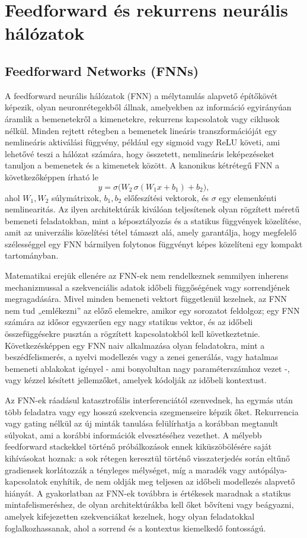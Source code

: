 \chapter{Feedforward és rekurrens neurális hálózatok}
\section{Feedforward Networks (FNNs)}
A feedforward neurális hálózatok (FNN) a mélytanulás alapvető építőkövét képezik, olyan neuronrétegekből állnak, amelyekben az információ egyirányúan áramlik a bemenetekről a kimenetekre, rekurrens kapcsolatok vagy ciklusok nélkül.  Minden rejtett rétegben a bemenetek lineáris transzformációját egy nemlineáris aktiválási függvény, például egy sigmoid vagy ReLU követi, ami lehetővé teszi a hálózat számára, hogy összetett, nemlineáris leképezéseket tanuljon a bemenetek és a kimenetek között. A kanonikus kétrétegű FNN a következőképpen írható le 
\[
y = \sigma\bigl(W_2\,\sigma(W_1 x + b_1) + b_2\bigr),
\]
ahol \(W_1, W_2\) súlymátrixok, \(b_1,b_2\) előfeszítési vektorok, és \(\sigma\) egy elemenkénti nemlinearitás. Az ilyen architektúrák kiválóan teljesítenek olyan rögzített méretű bemeneti feladatokban, mint a képosztályozás és a statikus függvények közelítése, amit az univerzális közelítési tétel támaszt alá, amely garantálja, hogy megfelelő szélességgel egy FNN bármilyen folytonos függvényt képes közelíteni egy kompakt tartományban.

Matematikai erejük ellenére az FNN-ek nem rendelkeznek semmilyen inherens mechanizmussal a szekvenciális adatok időbeli függőségének vagy sorrendjének megragadására. Mivel minden bemeneti vektort függetlenül kezelnek, az FNN nem tud „emlékezni” az előző elemekre, amikor egy sorozatot feldolgoz; egy FNN számára az idősor egyszerűen egy nagy statikus vektor, és az időbeli összefüggésekre pusztán a rögzített kapcsolatokból kell következtetnie. Következésképpen egy FNN naiv alkalmazása olyan feladatokra, mint a beszédfelismerés, a nyelvi modellezés vagy a zenei generálás, vagy hatalmas bemeneti ablakokat igényel - ami bonyolultan nagy paraméterszámhoz vezet -, vagy kézzel késített jellemzőket, amelyek kódolják az időbeli kontextust. 

Az FNN-ek ráadásul katasztrofális interferenciától szenvednek, ha egymás után több feladatra vagy egy hosszú szekvencia szegmenseire képzik őket.  Rekurrencia vagy gating nélkül az új minták tanulása felülírhatja a korábban megtanult súlyokat, ami a korábbi információk elvesztéséhez vezethet. A mélyebb feedforward stackekkel történő próbálkozások ennek kiküszöbölésére saját kihívásokat hoznak: a sok rétegen keresztül történő visszaterjedés során eltűnő gradiensek korlátozzák a tényleges mélységet, míg a maradék vagy autópálya-kapcsolatok enyhítik, de nem oldják meg teljesen az időbeli modellezés alapvető hiányát. A gyakorlatban az FNN-ek továbbra is értékesek maradnak a statikus mintafelismeréshez, de olyan architektúrákba kell őket bővíteni vagy beágyazni, amelyek kifejezetten szekvenciákat kezelnek, hogy olyan feladatokkal foglalkozhassanak, ahol a sorrend és a kontextus kiemelkedő fontosságú. 

